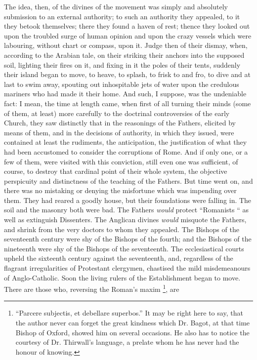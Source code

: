 The idea, then, of the divines of the movement was simply and
absolutely submission to an external authority; to such an authority
they appealed, to it they betook themselves; there they found a haven
of rest; thence they looked out upon the troubled surge of human
opinion and upon the crazy vessels which were labouring, without chart
or compass, upon it. Judge then of their dismay, when, according to
the Arabian tale, on their striking their anchors into the supposed
soil, lighting their fires on it, and fixing in it the poles of their
tents, suddenly their island began to move, to heave, to splash, to
frisk to and fro, to dive and at last to swim away, spouting out
inhospitable jets of water upon the credulous mariners who had made it
their home. And such, I suppose, was the undeniable fact: I mean, the
time at length came, when first of all turning their minds (some of
them, at least) more carefully to the doctrinal controversies of the
early Church, they saw distinctly that in the reasonings of the
Fathers, elicited by means of them, and in the decisions of authority,
in which they issued, were contained at least the rudiments, the
anticipation, the justification of what they had been accustomed to
consider the corruptions of Rome. And if only one, or a few of them,
were visited with this conviction, still even one was sufficient, of
course, to destroy that cardinal point of their whole system, the
objective perspicuity and distinctness of the teaching of the Fathers.
But time went on, and there was no mistaking or denying the misfortune
which was impending over them. They had reared a goodly house, but
their foundations were falling in. The soil and the masonry both were
bad. The Fathers \emph{would} protect ``Romanists `` as well as
extinguish Dissenters. The Anglican divines \emph{would} misquote the
Fathers, and shrink from the very doctors to whom they appealed. The
Bishops of the seventeenth century were shy of the Bishops of the
fourth; and the Bishops of the nineteenth were shy of the Bishops of
the seventeenth. The ecclesiastical courts upheld the sixteenth
century against the seventeenth, and, regardless of the flagrant
irregularities of Protestant clergymen, chastised the mild
misdemeanours of Anglo-Catholic. Soon the living rulers of the
Establishment began to move. There are those who, reversing the
Roman's maxim \footnote{``Parcere subjectis, et debellare
superbos.'' It may be right here to say, that the author never can
forget the great kindness which Dr. Bagot, at that time Bishop of
Oxford, showed him on several occasions. He also has to notice the
courtesy of Dr. Thirwall's language, a prelate whom he has never had
the honour of knowing.}, are

